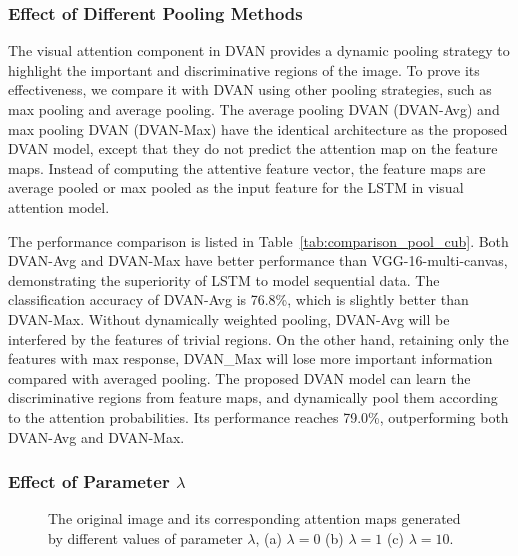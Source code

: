 \documentclass[journal]{IEEEtran}
\begin{document}
\subsubsection{Effect of Different Pooling Methods}
The visual attention component in DVAN provides a dynamic pooling strategy to highlight the important and discriminative regions of the image. To prove its effectiveness, we compare it with DVAN using other pooling strategies, such as max pooling and average pooling.
The average pooling DVAN (DVAN-Avg) and max pooling DVAN (DVAN-Max) have the identical architecture as the proposed DVAN model, except that they do not predict the attention map on the feature maps. Instead of computing the attentive feature vector, the feature maps are average pooled or max pooled as the input feature for the LSTM in visual attention model.

The performance comparison is listed in Table~\ref{tab:comparison_pool_cub}. Both DVAN-Avg and DVAN-Max have better performance than VGG-16-multi-canvas, demonstrating the superiority of LSTM to model sequential data. The classification accuracy of DVAN-Avg is 76.8\%, which is slightly better than DVAN-Max. Without dynamically weighted pooling, DVAN-Avg will be interfered by the features of trivial regions. On the other hand, retaining only the features with max response, DVAN\_Max will lose more important information compared with averaged pooling. The proposed DVAN model can learn the discriminative regions from feature maps, and dynamically pool them according to the attention probabilities. Its performance reaches 79.0\%, outperforming both DVAN-Avg and DVAN-Max.

\subsubsection{Effect of Parameter $\lambda$}
\begin{figure}[!t]
\centering
{}
\vspace{-0.1in}
\hfil
{}
\vspace{-0.1in}
\hfil
{}
\hfil
\caption{The original image and its corresponding attention maps generated by different values of parameter $\lambda$, (a) $\lambda=0$ (b) $\lambda=1$ (c) $\lambda=10$.}
\label{fig:lambda}
\end{figure}
\end{document}
